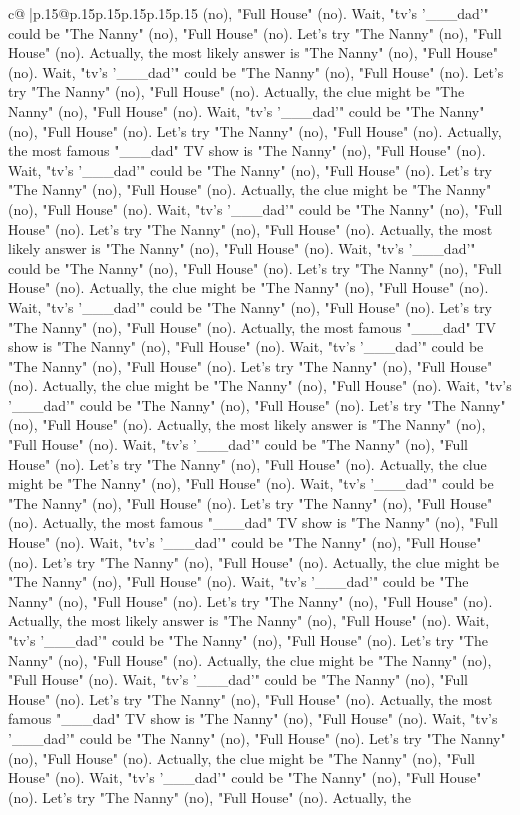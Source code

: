 \documentclass{article}
\begin{document}
{\begin{supertabular}{c@{$\;$}|p{.15\linewidth}@{}p{.15\linewidth}p{.15\linewidth}p{.15\linewidth}p{.15\linewidth}p{.15\linewidth}}
{{{(no), "Full House" (no). Wait, "tv's '\_\_\_dad'" could be "The Nanny" (no), "Full House" (no). Let's try "The Nanny" (no), "Full House" (no). Actually, the most likely answer is "The Nanny" (no), "Full House" (no). Wait, "tv's '\_\_\_dad'" could be "The Nanny" (no), "Full House" (no). Let's try "The Nanny" (no), "Full House" (no). Actually, the clue might be "The Nanny" (no), "Full House" (no). Wait, "tv's '\_\_\_dad'" could be "The Nanny" (no), "Full House" (no). Let's try "The Nanny" (no), "Full House" (no). Actually, the most famous "\_\_\_dad" TV show is "The Nanny" (no), "Full House" (no). Wait, "tv's '\_\_\_dad'" could be "The Nanny" (no), "Full House" (no). Let's try "The Nanny" (no), "Full House" (no). Actually, the clue might be "The Nanny" (no), "Full House" (no). Wait, "tv's '\_\_\_dad'" could be "The Nanny" (no), "Full House" (no). Let's try "The Nanny" (no), "Full House" (no). Actually, the most likely answer is "The Nanny" (no), "Full House" (no). Wait, "tv's '\_\_\_dad'" could be "The Nanny" (no), "Full House" (no). Let's try "The Nanny" (no), "Full House" (no). Actually, the clue might be "The Nanny" (no), "Full House" (no). Wait, "tv's '\_\_\_dad'" could be "The Nanny" (no), "Full House" (no). Let's try "The Nanny" (no), "Full House" (no). Actually, the most famous "\_\_\_dad" TV show is "The Nanny" (no), "Full House" (no). Wait, "tv's '\_\_\_dad'" could be "The Nanny" (no), "Full House" (no). Let's try "The Nanny" (no), "Full House" (no). Actually, the clue might be "The Nanny" (no), "Full House" (no). Wait, "tv's '\_\_\_dad'" could be "The Nanny" (no), "Full House" (no). Let's try "The Nanny" (no), "Full House" (no). Actually, the most likely answer is "The Nanny" (no), "Full House" (no). Wait, "tv's '\_\_\_dad'" could be "The Nanny" (no), "Full House" (no). Let's try "The Nanny" (no), "Full House" (no). Actually, the clue might be "The Nanny" (no), "Full House" (no). Wait, "tv's '\_\_\_dad'" could be "The Nanny" (no), "Full House" (no). Let's try "The Nanny" (no), "Full House" (no). Actually, the most famous "\_\_\_dad" TV show is "The Nanny" (no), "Full House" (no). Wait, "tv's '\_\_\_dad'" could be "The Nanny" (no), "Full House" (no). Let's try "The Nanny" (no), "Full House" (no). Actually, the clue might be "The Nanny" (no), "Full House" (no). Wait, "tv's '\_\_\_dad'" could be "The Nanny" (no), "Full House" (no). Let's try "The Nanny" (no), "Full House" (no). Actually, the most likely answer is "The Nanny" (no), "Full House" (no). Wait, "tv's '\_\_\_dad'" could be "The Nanny" (no), "Full House" (no). Let's try "The Nanny" (no), "Full House" (no). Actually, the clue might be "The Nanny" (no), "Full House" (no). Wait, "tv's '\_\_\_dad'" could be "The Nanny" (no), "Full House" (no). Let's try "The Nanny" (no), "Full House" (no). Actually, the most famous "\_\_\_dad" TV show is "The Nanny" (no), "Full House" (no). Wait, "tv's '\_\_\_dad'" could be "The Nanny" (no), "Full House" (no). Let's try "The Nanny" (no), "Full House" (no). Actually, the clue might be "The Nanny" (no), "Full House" (no). Wait, "tv's '\_\_\_dad'" could be "The Nanny" (no), "Full House" (no). Let's try "The Nanny" (no), "Full House" (no). Actually, the }}}
\end{supertabular}}
\end{document}
